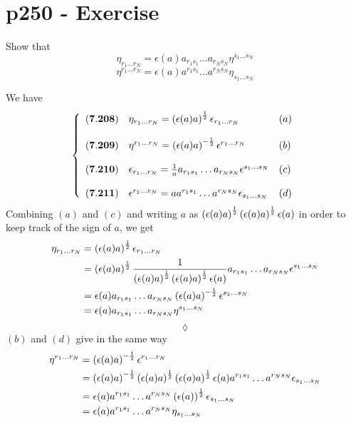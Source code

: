 \section{p250 - Exercise }
\begin{tcolorbox}
Show that
$$\eta_{r_1\dots r_N}= \epsilon(a)a_{r_1s_1}\dots a_{r_Ns_N}\eta^{s_1\dots s_N}$$
$$\eta^{r_1\dots r_N}= \epsilon(a)a^{r_1s_1}\dots a^{r_Ns_N}\eta_{s_1\dots s_N}$$
\end{tcolorbox}
We have 
\begin{align*}
\left\{\begin{array}{lll}
(\mathbf{7.208})&\eta_{r_1\dots r_N}= \left(\epsilon(a)a\right)^{\frac{1}{2}}\epsilon_{r_1\dots r_N}&(a)\\\\
(\mathbf{7.209})&\eta^{r_1\dots r_N}= \left(\epsilon(a)a\right)^{-\frac{1}{2}}\epsilon^{r_1\dots r_N}&(b)\\\\
(\mathbf{7.210})&\epsilon_{r_1\dots r_N}= \frac{1}{a} a_{r_1s_1}\dots a_{r_Ns_N}\epsilon^{s_1\dots s_N}&(c)\\\\
(\mathbf{7.211})&\epsilon^{r_1\dots r_N}= a a^{r_1s_1}\dots a^{r_Ns_N}\epsilon_{s_1\dots s_N}&(d)\\
\end{array}\right.
\end{align*}
Combining $(a)$ and $(c)$ and writing $a$ as $\left(\epsilon(a)a\right)^{\frac{1}{2}}\left(\epsilon(a)a\right)^{\frac{1}{2}} \epsilon(a)$ in order to keep track of the sign of $a$, we get
\begin{align*}
\eta_{r_1\dots r_N} &=\left(\epsilon(a)a\right)^{\frac{1}{2}}\epsilon_{r_1\dots r_N}\\
&=\left(\epsilon(a)a\right)^{\frac{1}{2}}\frac{1}{\left(\epsilon(a)a\right)^{\frac{1}{2}}\left(\epsilon(a)a\right)^{\frac{1}{2}} \epsilon(a)}a_{r_1s_1}\dots a_{r_Ns_N}\epsilon^{s_1\dots s_N}\\
&= \epsilon(a)a_{r_1s_1}\dots a_{r_Ns_N}\left(\epsilon(a)a\right)^{-\frac{1}{2}}\epsilon^{s_1\dots s_N}\\
&= \epsilon(a)a_{r_1s_1}\dots a_{r_Ns_N}\eta^{s_1\dots s_N}\\
\end{align*}
$$\lozenge$$
$(b)$ and $(d)$ give in the same way
\begin{align*}
\eta^{r_1\dots r_N} &= \left(\epsilon(a)a\right)^{-\frac{1}{2}}\epsilon^{r_1\dots r_N}\\
&=\left(\epsilon(a)a\right)^{-\frac{1}{2}}\left(\epsilon(a)a\right)^{\frac{1}{2}}\left(\epsilon(a)a\right)^{\frac{1}{2}} \epsilon(a)a^{r_1s_1}\dots a^{r_Ns_N}\epsilon_{s_1\dots s_N}\\
&=\epsilon(a)a^{r_1s_1}\dots a^{r_Ns_N}\left(\epsilon(a)\right)^{\frac{1}{2}}\epsilon_{s_1\dots s_N}\\
&=\epsilon(a)a^{r_1s_1}\dots a^{r_Ns_N}\eta_{s_1\dots s_N}
\end{align*}


